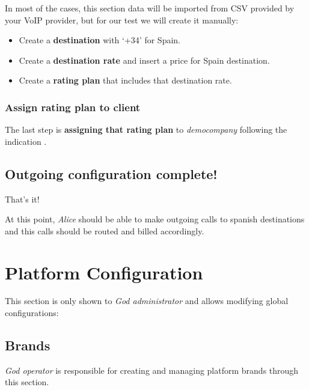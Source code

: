 \documentclass[letterpaper,10pt,english]{sphinxmanual}
\begin{document}
In most of the cases, this section data will be imported from CSV provided by your
VoIP provider, but for our test we will create it manually:
\begin{itemize}
\item {} 
Create a \textbf{destination} with `+34' for Spain.

\item {} 
Create a \textbf{destination rate} and insert a price for Spain destination.

\item {} 
Create a \textbf{rating plan} that includes that destination rate.

\end{itemize}


\subsection{Assign rating plan to client}
\label{getting_started/external_outgoing_calls/noplan_nocall:assign-rating-plan-to-client}
The last step is \textbf{assigning that rating plan} to \emph{democompany} following the indication
{\hyperref[administration_portal/brand/billing/rating_plans:assigning\string-rating\string-plans\string-to\string-clients]{}}.


\section{Outgoing configuration complete!}
\label{getting_started/external_outgoing_calls/finish:outgoing-configuration-complete}\label{getting_started/external_outgoing_calls/finish::doc}
That's it!

At this point, \emph{Alice} should be able to make outgoing calls to
spanish destinations and this calls should be routed and billed accordingly.


\chapter{Platform Configuration}
\label{administration_portal/platform/index::doc}\label{administration_portal/platform/index:platform-configuration}
This section is only shown to \emph{God administrator} and allows modifying global configurations:


\section{Brands}
\label{administration_portal/platform/brands:brands}\label{administration_portal/platform/brands::doc}
\emph{God operator} is responsible for creating and managing platform brands through this section.
\end{document}
